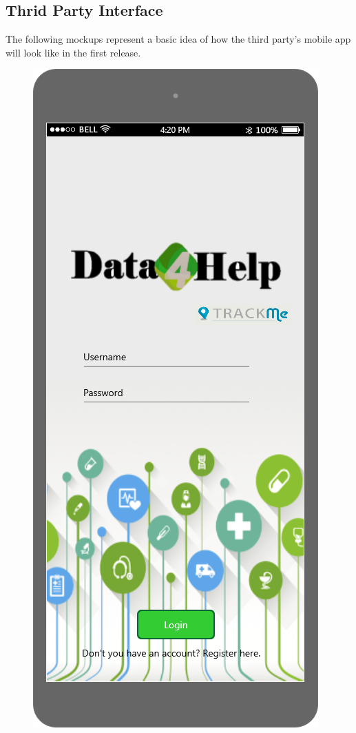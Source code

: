 \subsection{Thrid Party Interface}

The following mockups represent a basic idea of how the third party's mobile app will look like in the first 
release. 

\begin{figure}[h!]
	\centering
 	 \begin{minipage}[b]{0.25\textwidth}
    		\includegraphics[width=\textwidth]{./pictures/login_3p.png}

\end{minipage}
\end{figure}
